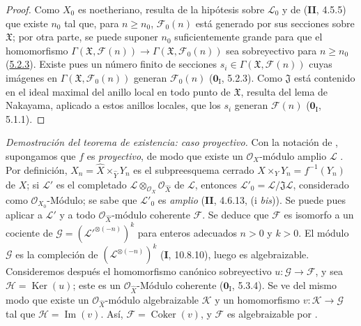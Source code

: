 \begin{proof}
Como $X_0$ es noetheriano, resulta de la hipótesis sobre $\mathcal L_0$ y de
(\textbf{II}, 4.5.5) que existe $n_0$ tal que, para $n\geq n_0$, $\mathcal F_0(n)$ está
generado por sus secciones sobre $\mathfrak X$; por otra parte, se puede suponer
$n_0$ suficientemente grande para que el homomorfismo
$\Gamma(\mathfrak X,\mathcal F(n))\longrightarrow
\Gamma(\mathfrak X,\mathcal F_0(n))$
sea sobreyectivo para $n\geq n_0$ (\hyperref[III.5.2.3-fr]{5.2.3}). Existe pues
un número finito de secciones $s_i\in\Gamma(\mathfrak X,\mathcal F(n))$ cuyas
imágenes en $\Gamma(\mathfrak X,\mathcal F_0(n))$ generan $\mathcal F_0(n)$
($\mathbf{0}_{\mathrm I}$, 5.2.3). Como $\mathfrak J$ está contenido en el ideal maximal del
anillo local en todo punto de $\mathfrak X$, resulta del lema de Nakayama,
aplicado a estos anillos locales, que los $s_i$ generan $\mathcal F(n)$
($\mathbf{0}_{\mathrm I}$, 5.1.1).
\end{proof}

\begin{env}[5.2.5]
\label{III.5.2.5}
\label{III.5.2.5-fr}
\emph{Demostración del teorema de existencia: caso proyectivo.}
Con la notación de , supongamos que $f$ es
\emph{proyectivo}, de modo que existe un $\mathcal O_X$-módulo amplio $\mathcal L$
. Por definición,
$X_n=\widehat X\times_{\widehat Y}Y_n$
es el subpreesquema cerrado
$X\times_Y Y_n=f^{-1}(Y_n)$ de $X$; si
$\mathcal L'$ es el
completado $\mathcal L\otimes_{\mathcal O_X}\mathcal O_{\widehat X}$ de $\mathcal L$, entonces
$\mathcal L'_0=\mathcal L/\mathfrak J\mathcal L$, considerado como
$\mathcal O_{X_0}$-Módulo; se sabe que $\mathcal L'_0$ es \emph{amplio}
(\textbf{II}, 4.6.13, (i \emph{bis})). Se puede pues aplicar a $\mathcal L'$ y a todo
$\mathcal O_{\widehat X}$-módulo coherente $\mathcal F$. Se deduce que
$\mathcal F$ es isomorfo a un cociente de
$\mathcal G=(\mathcal L'^{\otimes(-n)})^k$
para enteros adecuados $n>0$ y $k>0$. El módulo $\mathcal G$ es la
compleción de $(\mathcal L^{\otimes(-n)})^k$ (\textbf{I}, 10.8.10), luego es algebraizable. Consideremos después el homomorfismo canónico sobreyectivo $u:\mathcal G\to\mathcal F$, y sea $\mathcal H=\operatorname{Ker}(u)$; este es un
$\mathcal O_{\widehat X}$-Módulo coherente ($\mathbf{0}_{\mathrm I}$, 5.3.4). Se ve del
mismo modo que existe un $\mathcal O_{\widehat X}$-módulo algebraizable $\mathcal K$ y un homomorfismo
$v:\mathcal K\to\mathcal G$ tal que $\mathcal H=\operatorname{Im}(v)$. Así,
$\mathcal F=\operatorname{Coker}(v)$, y $\mathcal F$ es algebraizable por
.
\end{env}

